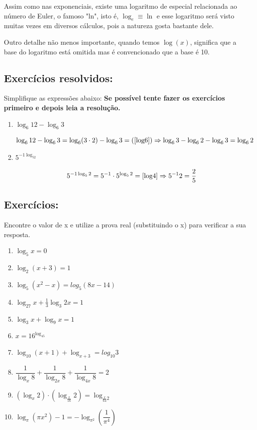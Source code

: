 \documentclass[10pt,a4paper]{article}
\begin{document}
		Assim como nas exponenciais, existe uma logaritmo de especial relacionada ao número de Euler, o famoso "ln", isto é, $ \log_e \equiv \ln $ e esse logaritmo será visto muitas vezes em diversos cálculos, pois a natureza gosta bastante dele.
		
		Outro detalhe não menos importante, quando temos $ \log (x) $, significa que a base do logaritmo está omitida mas é convencionado que a base é 10.

		\subsection{Exercícios resolvidos:}
		Simplifique as expressões abaixo: 
		\textbf{Se possível tente fazer os exercícios primeiro e depois leia a resolução.}
		\begin{enumerate}
			\item $\log_6 12 - \log_6 3 $
			
			$$ \log_6 12 - \log_6 3 = \log_6 (3 \cdot 2) - \log_6 3 = (\ref{log6}) \Rightarrow  \log_63 - \log_62 - \log_6 3  = \log_62 $$
			
			\item $ 5^{-1 \log_52}$
			
			$$ 5^{-1 \log_52} = 5^{-1} \cdot5^{\log_52} = \ref{log4} \Rightarrow 5^{-1} 2 = \dfrac{2}{5}$$
	\end{enumerate}	

\subsection{Exercícios:}
Encontre o valor de x e utilize a prova real (substituindo o x) para verificar a sua resposta.
\begin{enumerate}
	\item $ \log_5 x = 0 $
	
	\item$  \log_2 (x+3) = 1  $
	
	\item $ \log_5 (x^2 -x ) = log_5 (8x-14) $
	
	\item  $\log_{27} x + \frac{1}{3}\log_3 2x =1  $
	
	\item  $ \log_3 x +\log_9 x = 1 $
	
	\item $ x = 16^{\log_45} $
	
	\item $\log_{10} (x+1) + \log_{x+3} = log_{10} 3$
	
	\item $ \dfrac{1}{\log_x8} + \dfrac{1}{\log_{2x} 8} + \dfrac{1}{\log_{4x} 8} = 2 $
	
	\item $ (\log_x 2)\cdot(\log_{\frac{x}{16}} 2) = \log_{\frac{x}{64} 2} $
	
	\item $ \log_{\pi} (\pi x^2) - 1 = -\log_{\pi^2} \left(\dfrac{1}{\pi^4}\right) $
\end{enumerate}
			
\end{document}
